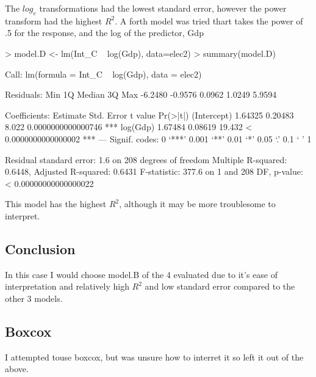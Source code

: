 \documentclass{article}
\begin{document}
The $log_e$ transformations had the lowest standard error, however the power transform had the highest $R^2$. A forth model was tried thart takes the power of .5 for the response, and the log of the predictor, Gdp

\begin{Schunk}
\begin{Sinput}
> model.D <- lm(Int_C ~ log(Gdp), data=elec2)
> summary(model.D)
\end{Sinput}
\begin{Soutput}
Call:
lm(formula = Int_C ~ log(Gdp), data = elec2)

Residuals:
    Min      1Q  Median      3Q     Max 
-6.2480 -0.9576  0.0962  1.0249  5.9594 

Coefficients:
            Estimate Std. Error t value             Pr(>|t|)    
(Intercept)  1.64325    0.20483   8.022   0.0000000000000746 ***
log(Gdp)     1.67484    0.08619  19.432 < 0.0000000000000002 ***
---
Signif. codes:  0 ‘***’ 0.001 ‘**’ 0.01 ‘*’ 0.05 ‘.’ 0.1 ‘ ’ 1

Residual standard error: 1.6 on 208 degrees of freedom
Multiple R-squared:  0.6448,	Adjusted R-squared:  0.6431 
F-statistic: 377.6 on 1 and 208 DF,  p-value: < 0.00000000000000022
\end{Soutput}
\end{Schunk}

This model has the highest $R^2$, although it may be more troublesome to interpret.

\subsection*{Conclusion}
In this case I would choose model.B of the 4 evaluated due to it's ease of interpretation and relatively high $R^2$ and low standard error compared to the other 3 models. 

\subsection*{Boxcox}
I attempted touse boxcox, but was unsure how to interret it so left it out of the above. 
\end{document}
